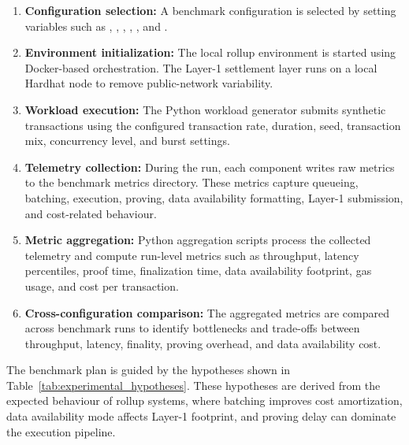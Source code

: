 \begin{enumerate}
    \item \textbf{Configuration selection:}
    A benchmark configuration is selected by setting variables such as , , , , , and .

    \item \textbf{Environment initialization:}
    The local rollup environment is started using Docker-based orchestration. The Layer-1 settlement layer runs on a local Hardhat node to remove public-network variability.

    \item \textbf{Workload execution:}
    The Python workload generator submits synthetic transactions using the configured transaction rate, duration, seed, transaction mix, concurrency level, and burst settings.

    \item \textbf{Telemetry collection:}
    During the run, each component writes raw metrics to the benchmark metrics directory. These metrics capture queueing, batching, execution, proving, data availability formatting, Layer-1 submission, and cost-related behaviour.

    \item \textbf{Metric aggregation:}
    Python aggregation scripts process the collected telemetry and compute run-level metrics such as throughput, latency percentiles, proof time, finalization time, data availability footprint, gas usage, and cost per transaction.

    \item \textbf{Cross-configuration comparison:}
    The aggregated metrics are compared across benchmark runs to identify bottlenecks and trade-offs between throughput, latency, finality, proving overhead, and data availability cost.
\end{enumerate}

The benchmark plan is guided by the hypotheses shown in Table~\ref{tab:experimental_hypotheses}. These hypotheses are derived from the expected behaviour of rollup systems, where batching improves cost amortization, data availability mode affects Layer-1 footprint, and proving delay can dominate the execution pipeline.

